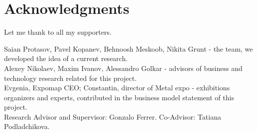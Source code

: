 \section*{Acknowledgments}

Let me thank to all my supporters.

Saian Protasov, Pavel Kopanev, Behnoosh Meskoob, Nikita Grunt - the team, we developed the idea of a current research. \\
Alexey Nikolaev, Maxim Ivanov, Alessandro Golkar - advisors of business and technology research related for this project. \\ 
Evgenia, Expomap CEO; Constantin, director of Metal expo - exhibitions organizers and experts, contributed in the business model statement of this project. \\
Research Advisor and Supervisor: Gonzalo Ferrer. 
Co-Advisor: Tatiana Podladchikova.
